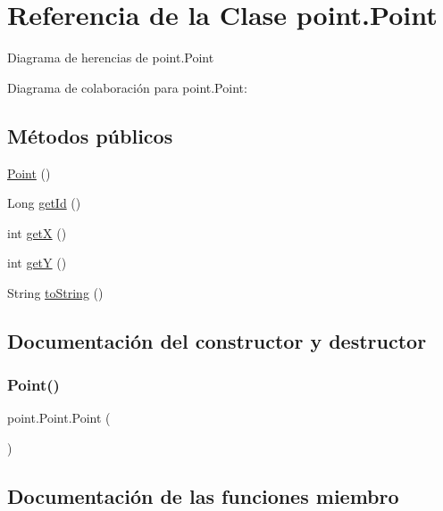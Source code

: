 \hypertarget{classpoint_1_1_point}{}\section{Referencia de la Clase point.\+Point}
\label{classpoint_1_1_point}


Diagrama de herencias de point.\+Point


Diagrama de colaboración para point.\+Point\+:
\subsection*{Métodos públicos}
\begin{DoxyCompactItemize}
\item 
\mbox{\hyperlink{classpoint_1_1_point_aa0d2c7dcdd1d27a4160ddd730fa38569}{Point}} ()
\item 
Long \mbox{\hyperlink{classpoint_1_1_point_a531ee07b4e2d7c852d2328a7d0a1b98e}{get\+Id}} ()
\item 
int \mbox{\hyperlink{classpoint_1_1_point_a780e7bec4443bf2d4572c62f5a1f3445}{getX}} ()
\item 
int \mbox{\hyperlink{classpoint_1_1_point_a9097efe451449289cd32cab0950d4658}{getY}} ()
\item 
String \mbox{\hyperlink{classpoint_1_1_point_a7b5bad86b8cc82d82af500efa72deb18}{to\+String}} ()
\end{DoxyCompactItemize}


\subsection{Documentación del constructor y destructor}
\mbox{\label{classpoint_1_1_point_aa0d2c7dcdd1d27a4160ddd730fa38569}} 
\subsubsection{\texorpdfstring{Point()}{Point()}}
{\footnotesize\ttfamily point.\+Point.\+Point (\begin{DoxyParamCaption}{ }\end{DoxyParamCaption})}



\subsection{Documentación de las funciones miembro}
\mbox{\label{classpoint_1_1_point_a531ee07b4e2d7c852d2328a7d0a1b98e}} 
